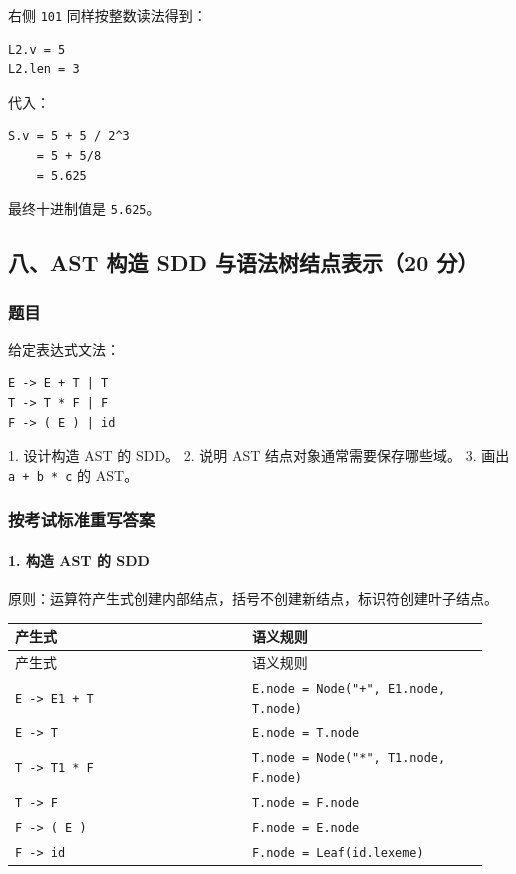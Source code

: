 \documentclass[UTF8]{ctexart}
\begin{document}
右侧 \texttt{101} 同样按整数读法得到：

\begin{Verbatim}[fontsize=\small,breaklines=true]
L2.v = 5
L2.len = 3
\end{Verbatim}

代入：

\begin{Verbatim}[fontsize=\small,breaklines=true]
S.v = 5 + 5 / 2^3
    = 5 + 5/8
    = 5.625
\end{Verbatim}

最终十进制值是 \texttt{5.625}。

\subsection*{八、AST 构造 SDD 与语法树结点表示（20 分）}

\subsubsection*{题目}

给定表达式文法：

\begin{Verbatim}[fontsize=\small,breaklines=true]
E -> E + T | T
T -> T * F | F
F -> ( E ) | id
\end{Verbatim}

1. 设计构造 AST 的 SDD。 2. 说明 AST 结点对象通常需要保存哪些域。 3. 画出 \texttt{a + b * c} 的 AST。

\subsubsection*{按考试标准重写答案}

\paragraph*{1. 构造 AST 的 SDD}

原则：运算符产生式创建内部结点，括号不创建新结点，标识符创建叶子结点。

\begin{longtable}{|p{0.47\linewidth}|p{0.47\linewidth}|}
\hline
产生式 & 语义规则 \\
\hline
\endfirsthead
产生式 & 语义规则 \\
\hline
\endhead
\texttt{E -> E1 + T} & \texttt{E.node = Node("+", E1.node, T.node)} \\
\hline
\texttt{E -> T} & \texttt{E.node = T.node} \\
\hline
\texttt{T -> T1 * F} & \texttt{T.node = Node("*", T1.node, F.node)} \\
\hline
\texttt{T -> F} & \texttt{T.node = F.node} \\
\hline
\texttt{F -> ( E )} & \texttt{F.node = E.node} \\
\hline
\texttt{F -> id} & \texttt{F.node = Leaf(id.lexeme)} \\
\hline
\end{longtable}
\end{document}
